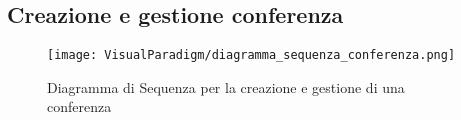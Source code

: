 \subsection{Creazione e gestione conferenza}
\label{sec:sequenza_conferenza}
\begin{figure}[H]
  \centering
  \texttt{[image: VisualParadigm/diagramma\_sequenza\_conferenza.png]}
  \caption{Diagramma di Sequenza per la creazione e gestione di una conferenza}
  \label{fig:sequenza_conferenza}
\end{figure}
\clearpage
